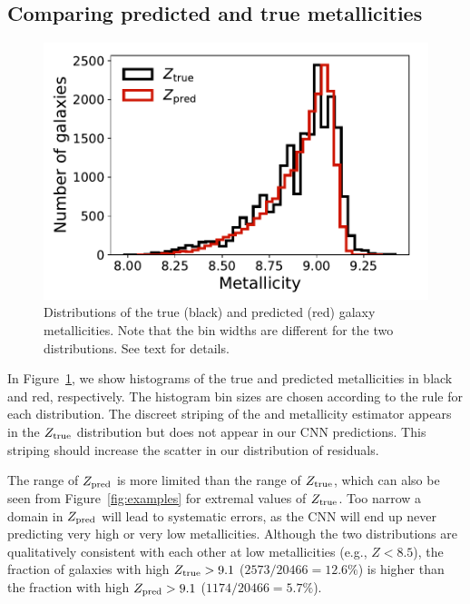\documentclass[fleqn,usenatbib]{mnras}
\newcommand{\eg}{e.g.}
\begin{document}
\subsection{Comparing predicted and true metallicities}
\begin{figure}
	\includegraphics[width=\columnwidth]{03-Z_distribution.pdf}
	\caption{\label{fig:distributions}
		Distributions of the true (black) and predicted (red) galaxy metallicities. Note that the bin widths are different for the two distributions. See text for details.}
\end{figure}

In Figure~\ref{fig:distributions}, we show histograms of the true and predicted metallicities in black and red, respectively. The histogram bin sizes are chosen according to the \cite{Freedman1981} rule for each distribution. The discreet striping of the \cite{Tremonti2004} and \cite{Brinchmann2004} metallicity estimator appears in the $Z_{\rm true}$ distribution but does not appear in our CNN predictions. This striping should increase the scatter in our distribution of residuals.

The range of $Z_{\rm pred}$ is more limited than the range of $Z_{\rm true}$, which can also be seen from Figure~\ref{fig:examples} for extremal values of $Z_{\rm true}$. Too narrow a domain in $Z_{\rm pred}$ will lead to systematic errors, as the CNN will end up never predicting very high or very low metallicities. Although the two distributions are qualitatively consistent with each other at low metallicities (\eg, $Z < 8.5$), the fraction of galaxies with high $Z_{\rm true} > 9.1$ ($2573/20466 = 12.6\%$) is higher than the fraction with high $Z_{\rm pred} > 9.1$ ($1174/20466 = 5.7\%$).
\end{document}
